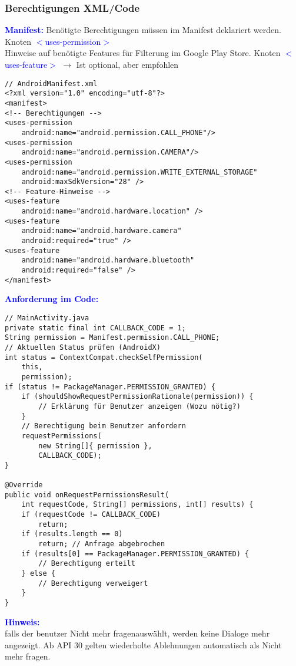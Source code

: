 \subsubsection{Berechtigungen XML/Code}
\textbf{\textcolor{blue}{Manifest:}}
Benötigte Berechtigungen müssen im Manifest deklariert werden. Knoten \textcolor{blue}{$<$uses-permission$>$}\\
Hinweise auf benötigte Features für Filterung im Google Play Store. Knoten \textcolor{blue}{$<$uses-feature$>$} $\rightarrow$ Ist optional, aber empfohlen
\begin{lstlisting}
// AndroidManifest.xml
<?xml version="1.0" encoding="utf-8"?>
<manifest>
<!-- Berechtigungen -->
<uses-permission
    android:name="android.permission.CALL_PHONE"/>
<uses-permission
    android:name="android.permission.CAMERA"/>
<uses-permission
    android:name="android.permission.WRITE_EXTERNAL_STORAGE"
    android:maxSdkVersion="28" />
<!-- Feature-Hinweise -->
<uses-feature
    android:name="android.hardware.location" />
<uses-feature
    android:name="android.hardware.camera"
    android:required="true" />
<uses-feature
    android:name="android.hardware.bluetooth"
    android:required="false" />
</manifest>
\end{lstlisting}
\textbf{\textcolor{blue}{Anforderung im Code:}}
\begin{lstlisting}
// MainActivity.java
private static final int CALLBACK_CODE = 1;
String permission = Manifest.permission.CALL_PHONE;
// Aktuellen Status prüfen (AndroidX)
int status = ContextCompat.checkSelfPermission(
    this,
    permission);
if (status != PackageManager.PERMISSION_GRANTED) {
    if (shouldShowRequestPermissionRationale(permission)) {
        // Erklärung für Benutzer anzeigen (Wozu nötig?)
    }
    // Berechtigung beim Benutzer anfordern
    requestPermissions(
        new String[]{ permission },
        CALLBACK_CODE);
}

@Override
public void onRequestPermissionsResult(
    int requestCode, String[] permissions, int[] results) {
    if (requestCode != CALLBACK_CODE)
        return;
    if (results.length == 0)
        return; // Anfrage abgebrochen
    if (results[0] == PackageManager.PERMISSION_GRANTED) {
        // Berechtigung erteilt
    } else {
        // Berechtigung verweigert
    }
}
\end{lstlisting}
\textbf{\textcolor{blue}{Hinweis:}}\\
falls der benutzer \dq Nicht mehr fragen\dq auswählt, werden keine Dialoge mehr angezeigt. Ab API 30 gelten wiederholte Ablehnungen automatisch als \dq Nicht mehr fragen\dq.

